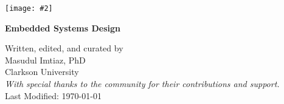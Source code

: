 
\newcommand{\centeredimage}[2][0.9\textwidth]{%
  \begin{center}
    \texttt{[image: \#2]} %
  \end{center}
}

\begin{titlepage}
  \begin{center}
    \thispagestyle{empty}
    \vspace*{1cm} %
    \centeredimage[0.75\textwidth]{cover-image.png} %
    \vspace*{1.5cm} %
    
    {{\Huge\bfseries Embedded Systems Design}\\[1em] \par}
    
    \vspace*{\fill}
    {\large Written, edited, and curated by \\[.1cm] Masudul Imtiaz, PhD \\[.2cm] Clarkson University \\[1em] 
    \normalsize {\itshape With special thanks to the community for their contributions and support.} \\[1em] \vfill 
    \scriptsize Last Modified: \today\par \vfill}
  \end{center}
\end{titlepage}
